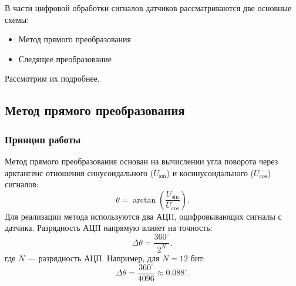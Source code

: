 В части цифровой обработки сигналов датчиков рассматриваются две основные схемы:
\begin{itemize}
    \item Метод прямого преобразования
    \item Следящее преобразование
\end{itemize}
Рассмотрим их подробнее.

\subsection{Метод прямого преобразования}
\subsubsection{Принцип работы}
Метод прямого преобразования \cite{Armenski} основан на вычислении угла поворота через арктангенс отношения синусоидального (\(U_{\sin}\)) и косинусоидального (\(U_{\cos}\)) сигналов:
\[
\theta = \arctan\left(\frac{U_{\sin}}{U_{\cos}}\right).
\]
Для реализации метода используются два АЦП, оцифровывающих сигналы с датчика. Разрядность АЦП напрямую влияет на точность: 
\[
\Delta\theta = \frac{360^\circ}{2^N},
\]
где \(N\) — разрядность АЦП. Например, для \(N = 12\) бит:
\[
\Delta\theta = \frac{360^\circ}{4096} \approx 0.088^\circ.
\]


